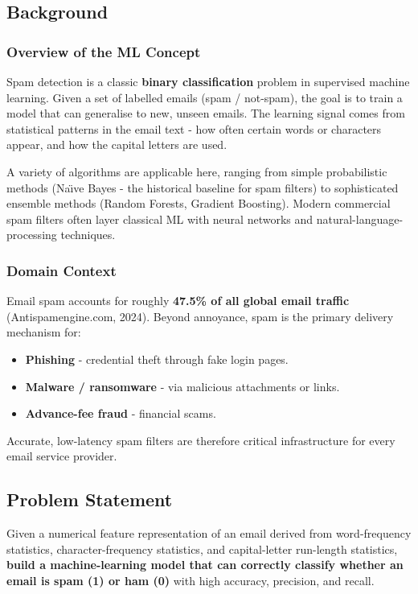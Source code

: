 \documentclass[12pt, a4paper]{article}
\begin{document}
\subsection{Background}

\subsubsection*{Overview of the ML Concept}
Spam detection is a classic \textbf{binary classification} problem in supervised machine learning. Given a set of labelled emails (spam / not-spam), the goal is to train a model that can generalise to new, unseen emails. The learning signal comes from statistical patterns in the email text - how often certain words or characters appear, and how the capital letters are used.

A variety of algorithms are applicable here, ranging from simple probabilistic methods (Na\"{\i}ve Bayes - the historical baseline for spam filters) to sophisticated ensemble methods (Random Forests, Gradient Boosting). Modern commercial spam filters often layer classical ML with neural networks and natural-language-processing techniques.

\subsubsection*{Domain Context}
Email spam accounts for roughly \textbf{47.5\% of all global email traffic} (Antispamengine.com, 2024). Beyond annoyance, spam is the primary delivery mechanism for:
\begin{itemize}
    \item \textbf{Phishing} - credential theft through fake login pages.
    \item \textbf{Malware / ransomware} - via malicious attachments or links.
    \item \textbf{Advance-fee fraud} - financial scams.
\end{itemize}

Accurate, low-latency spam filters are therefore critical infrastructure for every email service provider.

\subsection{Problem Statement}
Given a numerical feature representation of an email derived from word-frequency statistics, character-frequency statistics, and capital-letter run-length statistics, \textbf{build a machine-learning model that can correctly classify whether an email is spam (1) or ham (0)} with high accuracy, precision, and recall.
\end{document}
